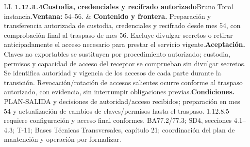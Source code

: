 \begin{longtable}{L{\tabcolsep\relax}L{\tabcolsep\relax}}
\texttt{1.\allowbreak{}12.\allowbreak{}8.\allowbreak{}4}\newline{}\textbf{Custodia, credenciales y recifrado autorizado}\newline{}Bruno Toro\newline{}1 instancia.\newline{}\textbf{Ventana:} 54--56. & \textbf{Contenido y frontera.} Preparación y transferencia autorizada de custodia, credenciales y recifrado desde mes 54, con comprobación final al traspaso de mes 56. Excluye divulgar secretos o retirar anticipadamente el acceso necesario para prestar el servicio vigente.\newline{}\textbf{Aceptación.} Claves no exportables se sustituyen por procedimiento autorizado; custodia, permisos y capacidad de acceso del receptor se comprueban sin divulgar secretos. Se identifica autoridad y vigencia de los accesos de cada parte durante la transición. Revocación/rotación de accesos salientes ocurre conforme al traspaso autorizado, con evidencia, sin interrumpir obligaciones previas.\newline{}\textbf{Condiciones.} PLAN-SALIDA y decisiones de autoridad/acceso recibidos; preparación en mes 54 y actualización de cambios de claves/permisos hasta el traspaso. 1.12.8.5 requiere configuración y acceso final conformes. BA77.2/77.3; SD4, secciones 4.1--4.3; T-11; Bases Técnicas Transversales, capítulo 21; coordinación del plan de mantención y operación por formalizar.\\\hline

\end{longtable}
